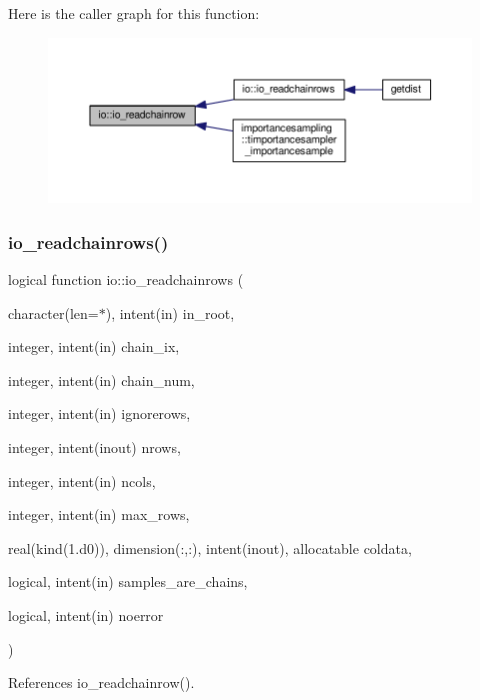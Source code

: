 Here is the caller graph for this function\+:
\nopagebreak
\begin{figure}[H]
\begin{center}
\leavevmode
\includegraphics[width=350pt]{namespaceio_a2ec9ab3b6936778533ec623b98d2b7b0_icgraph}
\end{center}
\end{figure}
\mbox{\label{namespaceio_af9199bcf411dd77ceb40961983436c41}} 
\subsubsection{\texorpdfstring{io\+\_\+readchainrows()}{io\_readchainrows()}}
{\footnotesize\ttfamily logical function io\+::io\+\_\+readchainrows (\begin{DoxyParamCaption}\item[{character(len=$\ast$), intent(in)}]{in\+\_\+root,  }\item[{integer, intent(in)}]{chain\+\_\+ix,  }\item[{integer, intent(in)}]{chain\+\_\+num,  }\item[{integer, intent(in)}]{ignorerows,  }\item[{integer, intent(inout)}]{nrows,  }\item[{integer, intent(in)}]{ncols,  }\item[{integer, intent(in)}]{max\+\_\+rows,  }\item[{real(kind(1.d0)), dimension(\+:,\+:), intent(inout), allocatable}]{coldata,  }\item[{logical, intent(in)}]{samples\+\_\+are\+\_\+chains,  }\item[{logical, intent(in)}]{noerror }\end{DoxyParamCaption})}



References io\+\_\+readchainrow().



